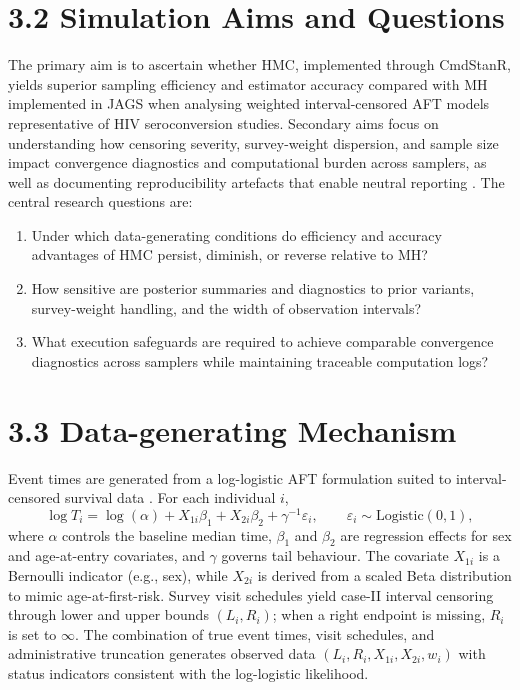 \section{3.2 Simulation Aims and Questions}
\label{sec:aims}
The primary aim is to ascertain whether HMC, implemented through CmdStanR, yields superior sampling efficiency and estimator accuracy compared with MH implemented in JAGS when analysing weighted interval-censored AFT models representative of HIV seroconversion studies. Secondary aims focus on understanding how censoring severity, survey-weight dispersion, and sample size impact convergence diagnostics and computational burden across samplers, as well as documenting reproducibility artefacts that enable neutral reporting \citep{Kelter2023BASIS}. The central research questions are:
\begin{enumerate}
  \item Under which data-generating conditions do efficiency and accuracy advantages of HMC persist, diminish, or reverse relative to MH?
  \item How sensitive are posterior summaries and diagnostics to prior variants, survey-weight handling, and the width of observation intervals?
  \item What execution safeguards are required to achieve comparable convergence diagnostics across samplers while maintaining traceable computation logs?
\end{enumerate}

\section{3.3 Data-generating Mechanism}
\label{sec:data-mechanism}
Event times are generated from a log-logistic AFT formulation suited to interval-censored survival data \citep{ZhangSun2010}. For each individual $i$,
\begin{equation}
\log T_i = \log(\alpha) + X_{1i}\beta_1 + X_{2i}\beta_2 + \gamma^{-1}\varepsilon_i, \qquad \varepsilon_i \sim \text{Logistic}(0,1),
\label{eq:aft-struct}
\end{equation}
where $\alpha$ controls the baseline median time, $\beta_1$ and $\beta_2$ are regression effects for sex and age-at-entry covariates, and $\gamma$ governs tail behaviour. The covariate $X_{1i}$ is a Bernoulli indicator (e.g., sex), while $X_{2i}$ is derived from a scaled Beta distribution to mimic age-at-first-risk. Survey visit schedules yield case-II interval censoring through lower and upper bounds $(L_i,R_i)$; when a right endpoint is missing, $R_i$ is set to $\infty$. The combination of true event times, visit schedules, and administrative truncation generates observed data $(L_i, R_i, X_{1i}, X_{2i}, w_i)$ with status indicators consistent with the log-logistic likelihood.

